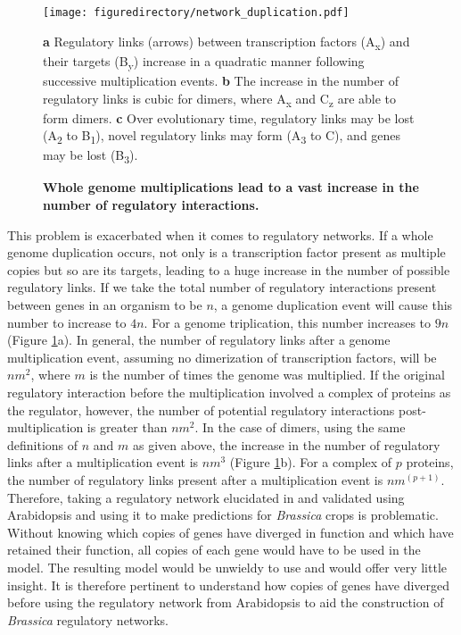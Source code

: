 \documentclass[12pt,]{book}
\begin{document}
\begin{figure}[htbp]
\centering
\texttt{[image: figuredirectory/network\_duplication.pdf]}
\caption{\textbf{Whole genome multiplications lead to a vast increase in
the number of regulatory interactions.}}{\textbf{a} Regulatory links
(arrows) between transcription factors (A\textsubscript{x}) and their
targets (B\textsubscript{y}) increase in a quadratic manner following
successive multiplication events. \textbf{b} The increase in the number
of regulatory links is cubic for dimers, where A\textsubscript{x} and
C\textsubscript{z} are able to form dimers. \textbf{c} Over evolutionary
time, regulatory links may be lost (A\textsubscript{2} to
B\textsubscript{1}), novel regulatory links may form (A\textsubscript{3}
to C), and genes may be lost
(B\textsubscript{3}).}\label{figure:1xx:networkduplication}
\end{figure}

This problem is exacerbated when it comes to regulatory networks. If a
whole genome duplication occurs, not only is a transcription factor
present as multiple copies but so are its targets, leading to a huge
increase in the number of possible regulatory links. If we take the
total number of regulatory interactions present between genes in an
organism to be \(n\), a genome duplication event will cause this number
to increase to \(4n\). For a genome triplication, this number increases
to \(9n\) (Figure \ref{figure:1xx:networkduplication}a). In general, the
number of regulatory links after a genome multiplication event, assuming
no dimerization of transcription factors, will be \(nm^2\), where \(m\)
is the number of times the genome was multiplied. If the original
regulatory interaction before the multiplication involved a complex of
proteins as the regulator, however, the number of potential regulatory
interactions post-multiplication is greater than \(nm^2\). In the case
of dimers, using the same definitions of \(n\) and \(m\) as given above,
the increase in the number of regulatory links after a multiplication
event is \(nm^3\) (Figure \ref{figure:1xx:networkduplication}b). For a
complex of \(p\) proteins, the number of regulatory links present after
a multiplication event is \(nm^{(p+1)}\). Therefore, taking a regulatory
network elucidated in and validated using Arabidopsis and using it to
make predictions for \emph{Brassica} crops is problematic. Without
knowing which copies of genes have diverged in function and which have
retained their function, all copies of each gene would have to be used
in the model. The resulting model would be unwieldy to use and would
offer very little insight. It is therefore pertinent to understand how
copies of genes have diverged before using the regulatory network from
Arabidopsis to aid the construction of \emph{Brassica} regulatory
networks.
\end{document}
